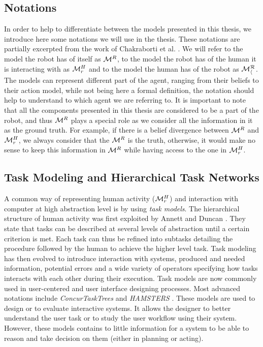 \documentclass[a4paper,11pt,twoside]{StyleThese}
\begin{document}
\subsection{Notations}
In order to help to differentiate between the models presented in this thesis, we introduce here some notations we will use in the thesis. These notations are partially excerpted from the work of Chakraborti et al. \cite{chakraborti2018human}. We will refer to the model the robot has of itself as $\mathcal{M}^R$, to the model the robot has of the human it is interacting with as $\mathcal{M}^H_r$ and to the model the human has of the robot as $\mathcal{M^R_h}$. The models can represent different part of the agent, ranging from their beliefs to their action model, while not being here a formal definition, the notation should help to understand to which agent we are referring to. It is important to note that all the components presented in this thesis are considered to be a part of the robot, and thus $\mathcal{M}^R$ plays a special role as we consider all the information in it as the ground truth. For example, if there is a belief divergence between $\mathcal{M}^R$ and $\mathcal{M}^H_r$, we always consider that the $\mathcal{M}^R$ is the truth, otherwise, it would make no sense to keep this information in $\mathcal{M}^R$ while having access to the one in $\mathcal{M}^H_r$.


\subsection{Task Modeling and Hierarchical Task Networks}
A common way of representing human activity ($\mathcal{M}^H_r$) and interaction with computer at high abstraction level is by using \textit{task models}. The hierarchical structure of human activity was first exploited by Annett and Duncan \cite{annett1967task}. They state that tasks can be described at several levels of abstraction until a certain criterion is met. Each task can thus be refined into subtasks detailing the procedure followed by the human to achieve the higher level task.
Task modeling has then evolved to introduce interaction with systems, produced and needed information, potential errors and a wide variety of operators specifying how tasks interacts with each other during their execution. Task models are now commonly used in user-centered and user interface designing processes. Most advanced notations include \textit{ConcurTaskTrees} \cite{paterno2004concurtasktrees} and \textit{HAMSTERS} \cite{martinie2019analysing}.
These models are used to design or to evaluate interactive systems. It allows the designer to better understand the user task or to study the user workflow using their system. However, these models contains to little information for a system to be able to reason and take decision on them (either in planning or acting).
\end{document}
